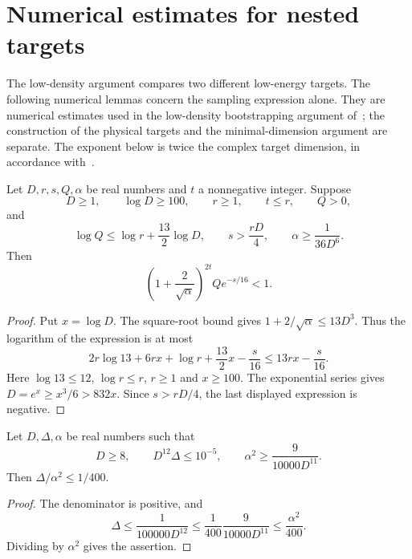 \section{Numerical estimates for nested targets}
\label{sec:nested_sampling_parameters}

The low-density argument compares two different low-energy targets.
The following numerical lemmas concern the sampling expression alone.
They are numerical estimates used in the low-density bootstrapping
argument of~\cite[lines 1112--1128]{Arad2016RigorousRG}; the construction of the
physical targets and the minimal-dimension argument are separate.
The exponent below is twice the complex target dimension, in accordance
with~\cite{gap:alvv16_random_sampling_net_count}.

\begin{lemma}
    \label{lem:nested_sampling_failure}
    \leanok
    Let $D,r,s,Q,\alpha$ be real numbers and $t$ a nonnegative integer.
    Suppose
    \[
        D\ge1,\qquad \log D\ge100,\qquad r\ge1,\qquad t\le r,
        \qquad Q>0,
    \]
    and
    \[
        \log Q\le\log r+\frac{13}{2}\log D,\qquad
        s>\frac{rD}{4},\qquad
        \alpha\ge\frac{1}{36D^6}.
    \]
    Then
    \[
        \left(1+\frac{2}{\sqrt\alpha}\right)^{2t}
        Q e^{-s/16}<1.
    \]
\end{lemma}
\begin{proof}\leanok
    Put $x=\log D$. The square-root bound gives
    $1+2/\sqrt\alpha\le13D^3$. Thus the logarithm of the expression
    is at most
    \[
        2r\log13+6rx+\log r+\frac{13}{2}x-\frac{s}{16}
        \le13rx-\frac{s}{16}.
    \]
    Here $\log13\le12$, $\log r\le r$, $r\ge1$ and $x\ge100$.
    The exponential series gives
    $D=e^x\ge x^3/6>832x$.
    Since $s>rD/4$, the last displayed expression is negative.
\end{proof}

\begin{lemma}
    \label{lem:nested_sampling_error}
    \leanok
    Let $D,\Delta,\alpha$ be real numbers such that
    \[
        D\ge8,\qquad D^{12}\Delta\le10^{-5},\qquad
        \alpha^2\ge\frac{9}{10000D^{11}}.
    \]
    Then $\Delta/\alpha^2\le1/400$.
\end{lemma}
\begin{proof}\leanok
    The denominator is positive, and
    \[
        \Delta\le\frac{1}{100000D^{12}}
        \le\frac{1}{400}\frac{9}{10000D^{11}}
        \le\frac{\alpha^2}{400}.
    \]
    Dividing by $\alpha^2$ gives the assertion.
\end{proof}

